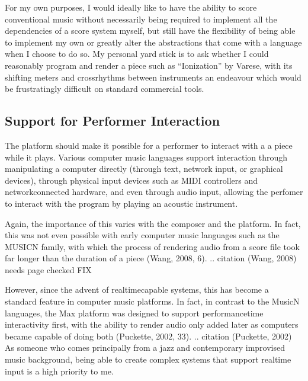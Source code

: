 \documentclass[letterpaper,10pt,english]{sphinxmanual}
\begin{document}
\sphinxAtStartPar
For my own purposes, I would ideally like to have the ability to score conventional music without
necessarily being required to implement all the dependencies of a score system myself,
but still have the flexibility of being able to implement my own or greatly alter the abstractions
that come with a language when I choose to do so.
My personal yard stick is to ask whether I could
reasonably program and render a piece such as “Ionization” by Varese, with its shifting
meters and cross\sphinxhyphen{}rhythms between instruments \sphinxhyphen{} an endeavour which would be frustratingly
difficult on standard commercial tools.


\subsection{Support for Performer Interaction}
\label{\detokenize{background:support-for-performer-interaction}}
\sphinxAtStartPar
The platform should make it possible for a performer to interact with a
a piece while it plays. Various computer music languages support interaction through
manipulating a computer directly (through text, network input, or graphical devices),
through physical input devices such as MIDI controllers and network\sphinxhyphen{}connected hardware,
and even through audio input, allowing the perfomer to interact with the program by playing
an acoustic instrument.

\sphinxAtStartPar
Again, the importance of this varies with the composer and the platform.
In fact, this was not even possible with early computer music languages such
as the MUSIC\sphinxhyphen{}N family, with which the process of rendering audio from a score file
took far longer than the duration of a piece (Wang, 2008, 6).
.. citation (Wang, 2008) needs page checked  FIX

\sphinxAtStartPar
However, since the advent of realtime\sphinxhyphen{}capable systems, this has become a
standard feature in computer music platforms.
In fact, in contrast to the Music\sphinxhyphen{}N languages, the Max platform was designed
to support performance\sphinxhyphen{}time interactivity first, with the ability to render audio only added later
as computers became capable of doing both (Puckette, 2002, 33).
.. citation (Puckette, 2002)
As someone who comes principally from a jazz and contemporary improvised music
background, being able to create complex systems that support realtime input is a high priority to me.
\end{document}
